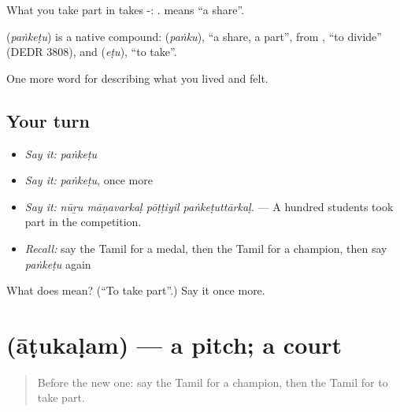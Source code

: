 What you take part in takes -:  .  means \textquotedblleft{}a share\textquotedblright{}.

\begin{cousinweb}
\textbf{} (\emph{paṅkeṭu}) is a native compound:  (\emph{paṅku}), \textquotedblleft{}a share, a part\textquotedblright{}, from , \textquotedblleft{}to divide\textquotedblright{} (DEDR 3808), and  (\emph{eṭu}), \textquotedblleft{}to take\textquotedblright{}.
\end{cousinweb}

\begin{grammarlens}[title={What you've built}]
One more word for describing what you lived and felt.
\end{grammarlens}

\subsection*{Your turn}
\begin{itemize}
\raggedright
  \item \emph{Say it:} \emph{paṅkeṭu}
  \item \emph{Say it:} \emph{paṅkeṭu}, once more
  \item \emph{Say it:} \emph{nūṟu māṇavarkaḷ pōṭṭiyil paṅkeṭuttārkaḷ.} — A hundred students took part in the competition.
  \item \emph{Recall:} say the Tamil for a medal, then the Tamil for a champion, then say \emph{paṅkeṭu} again
\end{itemize}

\begin{tcolorbox}[breakable,colback=teal!4,colframe=teal!35!black,title={Before you move on}]
What does  mean? (\textquotedblleft{}To take part\textquotedblright{}.) Say it once more.
\end{tcolorbox}
\section[\texorpdfstring{\ta{ஆடுகளம்} (āṭukaḷam)}{ஆடுகளம் (āṭukaḷam)}]{ (āṭukaḷam) — a pitch; a court}

\label{lesson:TA-C535-atukalam}



\begin{quote}
Before the new one: say the Tamil for a champion, then the Tamil for to take part.
\end{quote}

